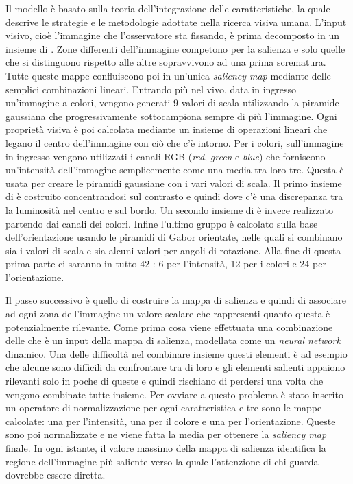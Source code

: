 \documentclass[%
	corpo=12pt,
    twoside,
    stile=classica,
    oldstyle,
    tipotesi=custom,
    greek,
    evenboxes,
]{toptesi}
\begin{document}
{Il modello è basato sulla teoria dell'integrazione delle caratteristiche, la quale descrive le strategie e le metodologie  adottate nella ricerca visiva umana. L'input visivo, cioè l'immagine che l'osservatore sta fissando, è prima decomposto in un insieme di . Zone differenti dell'immagine competono per la salienza e solo quelle che si distinguono rispetto alle altre sopravvivono ad una prima scrematura. Tutte queste mappe confluiscono poi in un'unica \textit{saliency map} mediante delle semplici combinazioni lineari.
Entrando più nel vivo, data in ingresso un'immagine a colori, vengono generati 9 valori di scala utilizzando la piramide gaussiana che progressivamente sottocampiona sempre di più l'immagine. Ogni proprietà visiva è poi calcolata mediante un insieme di operazioni lineari che legano il centro dell'immagine con ciò che c'è intorno. Per i colori, sull'immagine in ingresso vengono utilizzati i canali RGB (\textit{red}, \textit{green} e \textit{blue}) che forniscono un'intensità dell'immagine semplicemente come una media tra loro tre. Questa è usata per creare le piramidi gaussiane con i vari valori di scala. Il primo insieme di   è costruito concentrandosi sul contrasto e quindi dove c'è una discrepanza tra la luminosità nel centro e sul bordo. Un secondo insieme di  è invece realizzato partendo dai canali dei colori. Infine l'ultimo gruppo è calcolato sulla base dell'orientazione usando le piramidi di Gabor orientate, nelle quali si combinano sia i valori di scala e sia alcuni valori per angoli di rotazione. Alla fine di questa prima parte ci saranno in tutto 42  : 6 per l'intensità, 12 per i colori e 24 per l'orientazione. 

Il passo successivo è quello di costruire la mappa di salienza e quindi di associare ad ogni zona dell'immagine un valore scalare che rappresenti quanto questa è potenzialmente rilevante. Come prima cosa viene effettuata una combinazione delle  che è un input della mappa di salienza, modellata come un \textit{neural network} dinamico. Una delle difficoltà nel combinare insieme questi elementi è ad esempio che alcune sono difficili da confrontare tra di loro e gli elementi salienti appaiono rilevanti solo in poche di queste e quindi rischiano di perdersi una volta che vengono combinate tutte insieme. Per ovviare a questo problema è stato inserito un operatore di normalizzazione per ogni caratteristica e tre sono le mappe calcolate: una per l'intensità, una per il colore e una per l'orientazione. Queste sono poi normalizzate e ne viene fatta la media per ottenere la \textit{saliency map} finale. In ogni istante, il valore massimo della mappa di salienza identifica la regione dell'immagine più saliente verso la quale l'attenzione di chi guarda dovrebbe essere diretta.  

}
\end{document}
